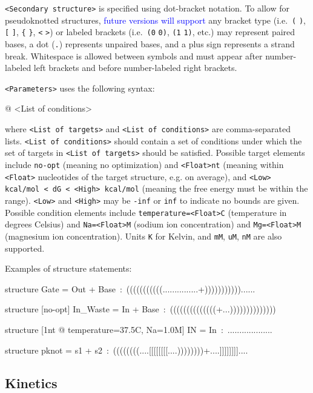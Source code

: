 \documentclass{article}
\newcommand{\add}[1]{\textcolor{blue}{#1}}
\newenvironment{code}
{\vspace{-0.1in}\par\begin{list}{}{
\setlength{\listparindent}{0pt}
\raggedright
\setlength{\itemsep}{0pt}
\setlength{\parsep}{0pt}
\normalfont\ttfamily}
 \item[]}
{\end{list}\vspace{-0.1in}}
\begin{document}
\texttt{<Secondary structure>} is specified using dot-bracket
notation. To allow for pseudoknotted structures, \add{future versions will support} any bracket type (i.e.\ \texttt{(} \texttt{)}, \texttt{[} \texttt{]}, \texttt{\{} \texttt{\}}, \texttt{<} \texttt{>}) or labeled brackets (i.e.\ \texttt{(0} \texttt{0)}, \texttt{(1} \texttt{1)}, etc.) may represent paired bases, a dot (\texttt{.}) represents unpaired bases, and a plus sign represents a strand break. Whitespace is allowed between symbols and must appear after number-labeled left brackets and before number-labeled right brackets. 

\texttt{<Parameters>} uses the following syntax:
\begin{code}
<List of targets> \textsf{@} <List of conditions>
\end{code}
where \texttt{<List of targets>} and \texttt{<List of conditions>} are
comma-separated lists. \texttt{<List of conditions>} should contain a
set of conditions under which the set of targets in \texttt{<List of
targets>} should be satisfied. Possible target elements include
\texttt{no-opt} (meaning no optimization) and \texttt{<Float>nt}
(meaning within \texttt{<Float>} nucleotides of the target
structure, e.g. on average), and \texttt{<Low> kcal/mol < dG < <High> kcal/mol} (meaning the free energy must be within the range).
\texttt{<Low>} and \texttt{<High>} may be \texttt{-inf} or \texttt{inf} to indicate no bounds are given. 
Possible condition elements include
\texttt{temperature=<Float>C} (temperature in degrees Celsius) and
\texttt{Na=<Float>M} (sodium ion concentration) and
\texttt{Mg=<Float>M} (magnesium ion concentration).
Units \texttt{K} for Kelvin, and \texttt{mM}, \texttt{uM}, \texttt{nM} are also supported.


Examples of structure statements:
\begin{code}
structure Gate = Out + Base~:~(((((((((((...............+)))))))))))......

structure [no-opt] In\_Waste = In + Base~:~((((((((((((((+...))))))))))))))

structure [1nt \textsf{@} temperature=37.5C, Na=1.0M] IN = In~:~...................

structure pknot = s1 + s2~:~((((((((....[[[[[[[[....))))))))+....]]]]]]]]....
\end{code}

\subsection{Kinetics}
\end{document}
